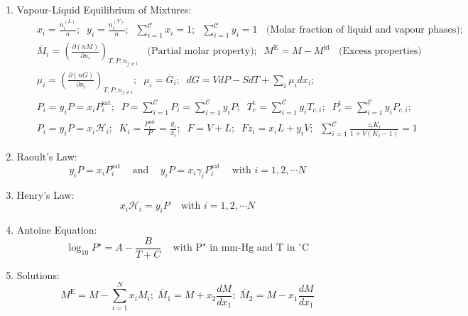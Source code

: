 \documentclass[12pts,a4paper,amsmath,amssymb,floatfix]{article}%
\newcommand{\frc}{\displaystyle\frac}
\newcommand{\Partial}[3][error]{\left(\frc{\partial #1}{\partial #2}\right)_{#3}}
\newcommand{\mfr}[3][error]{#1_{#2}^{\left(#3\right)}}
\newcommand{\summation}[3][error]{\sum\limits_{#2}^{#3}#1}
\begin{document}
\begin{enumerate}[1.]
\item Vapour-Liquid Equilibrium of Mixtures:
  \begin{eqnarray}
    && x_{i} = \frc{\mfr[n]{i}{L}}{n};\;\; y_{i} = \frc{\mfr[n]{i}{V}}{n};\;\; \summation[x_{i}]{i=1}{\mathcal{C}} = 1;\;\;\summation[y_{i}]{i=1}{\mathcal{C}} = 1\;\; \text{ (Molar fraction of liquid and vapour phases)}; \nonumber \\
    && \overline{M}_{i} = \Partial[(nM)]{n_{i}}{T,P,n_{j\ne i}}\;\; \text{ (Partial molar property)};\;\; M^{\text{E}} = M - M^{\text{id}}\;\;\text{ (Excess properties)} \nonumber \\
    && \mu_{i} = \Partial[(nG)]{n_{i}}{T,P,n_{j\ne i}}; \;\; \mu_{i} = \overline{G}_{i}; \;\; dG = VdP -SdT + \summation[\mu_{i}dx_{i}]{i}{}; \nonumber \\
    && P_{i} = y_{i}P = x_{i}P_{i}^{\text{sat}};\;\;P = \summation[P_{i}]{i=1}{\mathcal{C}} = \summation[y_{i}P]{i=1}{\mathcal{C}};\;\; T_{c}^{\text{t}} = \summation[y_{i}T_{c,i}]{i=1}{\mathcal{C}};\;\; P_{c}^{\text{t}} = \summation[y_{i}P_{c,i}]{i=1}{\mathcal{C}}; \nonumber \\
    && P_{i} = y_{i}P = x_{i}\mathcal{H}_{i};\;\;  K_{i} = \frc{P_{i}^{\text{sat}}}{P} = \frc{y_{i}}{x_{i}};\;\; F = V + L;\;\; Fz_{i} = x_{i}L + y_{i}V; \;\; \summation[\frc{z_{i}K_{i}}{1+V\left(K_{i}-1\right)}]{i=1}{\mathcal{C}} = 1\nonumber 
  \end{eqnarray}







  
\item Raoult's Law:\\
\begin{displaymath}
y_{i}P = x_{i}P_{i}^{\text{sat}}\;\;\;\text{ and } \;\;\; y_{i}P = x_{i}\gamma_{i}P_{i}^{\text{sat}}\;\;\;\text{ with } i=1,2,\cdots N
\end{displaymath}

\item Henry's Law:\\
\begin{displaymath}
x_{i}\mathcal{H}_{i} = y_{i}P\;\;\;\text{ with } i=1,2,\cdots N
\end{displaymath}

\item Antoine Equation:\\
\begin{displaymath}
\log_{10} P^{\star} = A-\frc{B}{T+C}\;\;\;\text{ with P}^{\star}\text{ in mm-Hg and T in }^{\circ}\text{C}
\end{displaymath}

\item Solutions:\\
\begin{displaymath}
M^{\text{E}} = M - \sum\limits_{i=1}^{N} x_{i}M_{i}; \; \overline{M}_{1}=M+x_{2}\frc{d M}{dx_{1}};\; \overline{M}_{2} = M - x_{1}\frc{d M}{dx_{1}}
\end{displaymath}

\end{enumerate}
\end{document}
